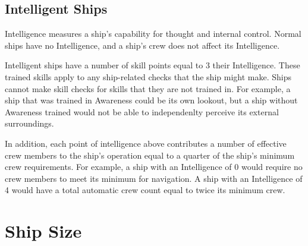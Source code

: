   \subsection{Intelligent Ships}\label{Intelligent Ships}
    Intelligence measures a ship's capability for thought and internal control.
    Normal ships have no Intelligence, and a ship's crew does not affect its Intelligence.

    Intelligent ships have a number of skill points equal to 3 \add their Intelligence.
    These trained skills apply to any ship-related checks that the ship might make.
    Ships cannot make skill checks for skills that they are not trained in.
    For example, a ship that was trained in Awareness could be its own lookout, but a ship without Awareness trained would not be able to independenlty perceive its external surroundings.

    In addition, each point of intelligence above  contributes a number of effective crew members to the ship's operation equal to a quarter of the ship's minimum crew requirements.
    For example, a ship with an Intelligence of 0 would require no crew members to meet its minimum for navigation.
    A ship with an Intelligence of 4 would have a total automatic crew count equal to twice its minimum crew.

\section{Ship Size}\label{Ship Size}

